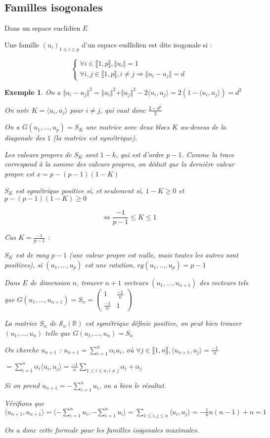 \documentclass[a4paper,12pt]{book}
\newcommand{\Def}[2]{\begin{tcolorbox}[sharp corners, colback=white,colframe=blue!90!black!75, title=Définition : #1]#2\end{tcolorbox}}
\newtheorem{Exe}{Exemple}[section]
\def\R{\mathbb{R}}
\begin{document}
\subsection{Familles isogonales}
Dans un espace euclidien $E$
\Def{}{Une famille $(u_i)_{1\leq i\leq p}$ d'un espace eudlidien est dite isogonale si :
\par $$\left\{\begin{array}{l}\forall i\in\llbracket 1, p\rrbracket, \Vert u_i\Vert = 1 \\ \forall i,j\in\llbracket 1,p\rrbracket, i\neq j \Rightarrow \Vert u_i-u_j\Vert = d\end{array}\right.$$}
\begin{Exe}
On a $\Vert u_i-u_j\Vert^2=\Vert u_i\Vert^2 + \Vert u_j\Vert^2 - 2\langle u_i, u_j\rangle = 2 (1-\langle u_i, u_j\rangle) = d^2$
\par  On note $K = \langle u_i,u_j \rangle$ pour $i\neq j$, qui vaut donc $\frac{2-d^2}{2}$
\par On a $G(u_1,..., u_p) = S_K$ une matrice avec deux blocs $K$ au-dessus de la diagonale des $1$ (la matrice est symétrique).
\par Les valeurs propres de $S_K$ sont $1-k$, qui est d'ordre $p-1$. Comme la trace correspond à la somme des valeurs propres, on déduit que la dernière valeur propre est $x = p-(p-1)(1-K)$
\par $S_K$ est symétrique positive si, et seulement si, $1-K\geq 0$ et $p-(p-1)(1-K)\geq 0$
\par $$\Leftrightarrow \frac{-1}{p-1}\leq K\leq 1$$
\par Cas $K= \frac{-1}{p-1}$ :
\par $S_K$ est de rang $p-1$ (une valeur propre est nulle, mais toutes les autres sont positives), si $(u_1,..., u_p)$ est une rotation, $rg(u_1,..., u_p)=p-1$
\par Dans $E$ de dimension $n$, trouver $n+1$ vecteurs $(u_1,..., u_{n+1})$ des vecteurs tels que $G(u_1,..., u_{n+1})=S_n=\begin{pmatrix} 1 & \frac{-1}{n} \\ \frac{-1}{n} & 1\end{pmatrix}$
\par La matrice $S_n$ de $\mathcal{S}_n(\R)$ est symétrique définie positive, on peut bien trouver $(u_1,..., u_n)$ telle que $G(u_1,..., u_n)=S_n$
\par On cherche $u_{n+1}$ : $u_{n+1}=\sum\limits_{i=1}^n\alpha_iu_i$, où $\forall j\in\llbracket 1, n\rrbracket, \langle u_{n+1}, u_j\rangle =\frac{-1}{n}$
\par$= \sum\limits_{i=1}^n\alpha_i\langle u_i, u_j\rangle = \frac{-1}{n}\sum\limits_{1\leq i\leq n, i\neq j} \alpha_i + \alpha_j$
\par Si on prend $u_{n+1} = -\sum\limits_{i=1}^nu_i$, on a bien le résultat.
\par Vérifions que $\langle u_{n+1}, u_{n+1}\rangle= \langle -\sum\limits_{i=1}^nu_i, -\sum\limits_{i=1}^nu_i\rangle=\sum\limits_{1\leq i, j\leq n}\langle u_i, u_j\rangle =-\frac{1}{n}n(n-1) + n = 1$
\par On a donc cette formule pour les familles isogonales maximales.
\end{Exe}
\end{document}
